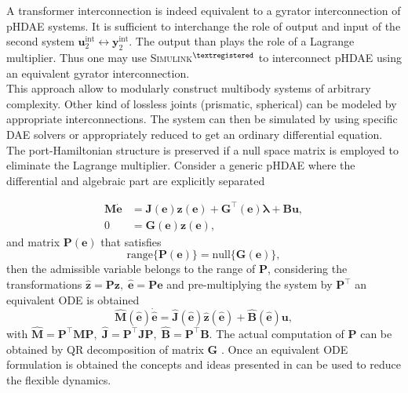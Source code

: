 \documentclass{svjour3}                     %
\begin{document}
A transformer interconnection is indeed equivalent to a gyrator interconnection of pHDAE systems. It is sufficient to interchange the role of output and input of the second system $\bm{u}_2^{\text{int}} \leftrightarrow \bm{y}_2^{\text{int}}$. The output than plays the role of a Lagrange multiplier.  Thus one may use \textsc{Simulink}$^{\tiny{\textregistered}}$ to interconnect pHDAE using an equivalent gyrator interconnection. \\
 
This approach allow to modularly construct multibody systems of arbitrary complexity. Other kind of lossless joints (prismatic, spherical) can be modeled by appropriate interconnections. The system can then be simulated by using specific DAE solvers \cite{daePetzold} or appropriately reduced to get an ordinary differential equation. The port-Hamiltonian structure is preserved if a null space matrix is employed to eliminate the Lagrange multiplier. Consider a generic pHDAE where the differential and algebraic part are explicitly separated

\begin{equation}
\begin{aligned}
\bm{M} \dot{\bm{e}} &=  \bm{J}(\bm{e})\bm{z}(\bm{e}) + \bm{G}^\top(\bm{e}) \bm{\lambda} + \bm{B}\bm{u}, \\ 
0 &= \bm{G}(\bm{e})\bm{z}(\bm{e}),
\end{aligned}
\end{equation}
and matrix $\bm{P}(\bm{e})$ that satisfies 
\[
\mathrm{range}\{\bm{P}(\bm{e})\} = \mathrm{null}\{\bm{G}(\bm{e})\},
\]
then the admissible variable belongs to the range of $\bm{P}$, considering the transformations $\widehat{\bm{z}} = \bm{P} \bm{z}, \; \widehat{\bm{e}} = \bm{P} \bm{e}$ and pre-multiplying the system by $\bm{P}^\top$ an equivalent ODE is obtained
\[
\widehat{\bm{M}}(\widehat{\bm{e}}) \dot{\widehat{\bm{e}}} =  \widehat{\bm{J}}(\widehat{\bm{e}})\widehat{\bm{z}}(\widehat{\bm{e}}) + \widehat{\bm{B}}(\widehat{\bm{e}})\bm{u},
\]
with $\widehat{\bm{M}} = \bm{P}^\top \bm{M} \bm{P}, \; \widehat{\bm{J}} = \bm{P}^\top \bm{J} \bm{P}, \; \widehat{\bm{B}} = \bm{P}^\top \bm{B}$. The actual computation of $\bm{P}$ can be obtained by QR decomposition of matrix $\bm{G}$ \cite{nullspaceFlMult}. Once an equivalent ODE formulation is obtained the concepts and ideas presented in \cite{phode_red} can be used to reduce the flexible dynamics.
\end{document}
